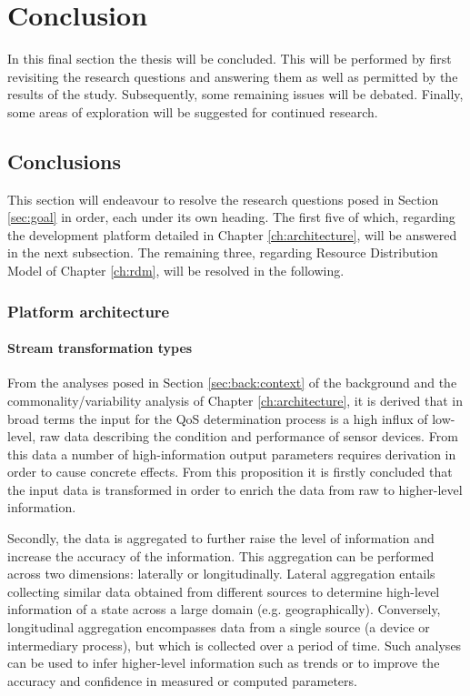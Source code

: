 \chapter{Conclusion}
In this final section the thesis will be concluded. This will be performed by first revisiting the research questions and answering them as well as permitted by the results of the study. Subsequently, some remaining issues will be debated. Finally, some areas of exploration will be suggested for continued research.

\section{Conclusions}
\label{sec:conclusions}
This section will endeavour to resolve the research questions posed in Section \ref{sec:goal} in order, each under its own heading. The first five of which, regarding the development platform detailed in Chapter \ref{ch:architecture}, will be answered in the next subsection. The remaining three, regarding Resource Distribution Model of Chapter \ref{ch:rdm}, will be resolved in the following.
\subsection{Platform architecture}
\subsubsection{Stream transformation types}
From the analyses posed in Section \ref{sec:back:context} of the background and the commonality/variability analysis of Chapter \ref{ch:architecture}, it is derived that in broad terms the input for the QoS determination process is a high influx of low-level, raw data describing the condition and performance of sensor devices. From this data a number of high-information output parameters requires derivation in order to cause concrete effects. From this proposition it is firstly concluded that the input data is transformed in order to enrich the data from raw to higher-level information. 

Secondly, the data is aggregated to further raise the level of information and increase the accuracy of the information. This aggregation can be performed across two dimensions: laterally or longitudinally. Lateral aggregation entails collecting similar data obtained from different sources to determine high-level information of a state across a large domain (e.g. geographically). Conversely, longitudinal aggregation encompasses data from a single source (a device or intermediary process), but which is collected over a period of time. Such analyses can be used to infer higher-level information such as trends or to improve the accuracy and confidence in measured or computed parameters. 

